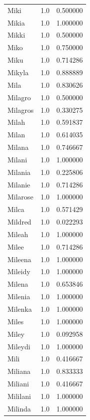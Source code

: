 \documentclass[
  letterpaper,
  DIV=11,
  numbers=noendperiod]{scrreprt}
\begin{document}
\begin{tabular}{lrr}
Miki            &   1.0 &   0.500000 \\
Mikia           &   1.0 &   1.000000 \\
Mikki           &   1.0 &   0.500000 \\
Miko            &   1.0 &   0.750000 \\
Miku            &   1.0 &   0.714286 \\
Mikyla          &   1.0 &   0.888889 \\
Mila            &   1.0 &   0.830626 \\
Milagro         &   1.0 &   0.500000 \\
Milagros        &   1.0 &   0.330275 \\
Milah           &   1.0 &   0.591837 \\
Milan           &   1.0 &   0.614035 \\
Milana          &   1.0 &   0.746667 \\
Milani          &   1.0 &   1.000000 \\
Milania         &   1.0 &   0.225806 \\
Milanie         &   1.0 &   0.714286 \\
Milarose        &   1.0 &   1.000000 \\
Milca           &   1.0 &   0.571429 \\
Mildred         &   1.0 &   0.022293 \\
Mileah          &   1.0 &   1.000000 \\
Milee           &   1.0 &   0.714286 \\
Mileena         &   1.0 &   1.000000 \\
Mileidy         &   1.0 &   1.000000 \\
Milena          &   1.0 &   0.653846 \\
Milenia         &   1.0 &   1.000000 \\
Milenka         &   1.0 &   1.000000 \\
Miles           &   1.0 &   1.000000 \\
Miley           &   1.0 &   0.092958 \\
Mileydi         &   1.0 &   1.000000 \\
Mili            &   1.0 &   0.416667 \\
Miliana         &   1.0 &   0.833333 \\
Miliani         &   1.0 &   0.416667 \\
Mililani        &   1.0 &   1.000000 \\
Milinda         &   1.0 &   1.000000 \\

\end{tabular}
\end{document}
